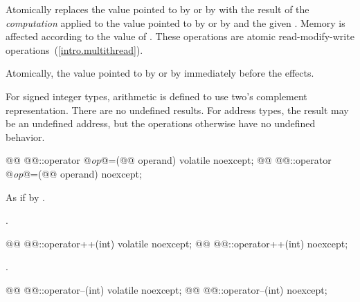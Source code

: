 \begin{itemdescr}
\pnum
\effects Atomically replaces the value pointed to by  or by
 with the result of the \textit{computation} applied to the
value pointed to by  or by  and the given .
Memory is affected according to the value of .
These operations are atomic read-modify-write operations~(\ref{intro.multithread}).

\pnum
\returns Atomically, the value pointed to by  or by  immediately before the effects.

\pnum
\remarks For signed integer types, arithmetic is defined to use two's complement
representation. There are no undefined results. For address types, the result may be an
undefined address, but the operations otherwise have no undefined behavior.
\end{itemdescr}

%
\begin{itemdecl}
@@ @@::operator @\textit{op}@=(@@ operand) volatile noexcept;
@@ @@::operator @\textit{op}@=(@@ operand) noexcept;
\end{itemdecl}

\begin{itemdescr}
\pnum
\effects As if by .

\pnum
\returns {}.
\end{itemdescr}

%
\begin{itemdecl}
@@ @@::operator++(int) volatile noexcept;
@@ @@::operator++(int) noexcept;
\end{itemdecl}

\begin{itemdescr}
\pnum
\returns {}.
\end{itemdescr}

%
\begin{itemdecl}
@@ @@::operator--(int) volatile noexcept;
@@ @@::operator--(int) noexcept;
\end{itemdecl}

